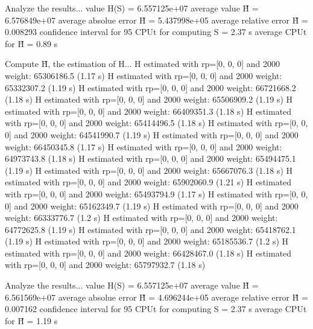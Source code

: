 Analyze the results...
  value H(S)                  = 6.557125e+07 
  average value H̃             = 6.576849e+07 
  average absolue error H̃     = 5.437998e+05 
  average relative error H̃    = 0.008293 
  confidence interval for 95%
  CPUt for computing S         = 2.37 s
  average CPUt for H̃           = 0.89 s

Compute H̃, the estimation of H...
  H estimated with rp=[0, 0, 0] and 2000 weight:  65306186.5  (1.17 s)
  H estimated with rp=[0, 0, 0] and 2000 weight:  65332307.2  (1.19 s)
  H estimated with rp=[0, 0, 0] and 2000 weight:  66721668.2  (1.18 s)
  H estimated with rp=[0, 0, 0] and 2000 weight:  65506909.2  (1.19 s)
  H estimated with rp=[0, 0, 0] and 2000 weight:  66409351.3  (1.18 s)
  H estimated with rp=[0, 0, 0] and 2000 weight:  65414496.5  (1.18 s)
  H estimated with rp=[0, 0, 0] and 2000 weight:  64541990.7  (1.19 s)
  H estimated with rp=[0, 0, 0] and 2000 weight:  66450345.8  (1.17 s)
  H estimated with rp=[0, 0, 0] and 2000 weight:  64973743.8  (1.18 s)
  H estimated with rp=[0, 0, 0] and 2000 weight:  65494475.1  (1.19 s)
  H estimated with rp=[0, 0, 0] and 2000 weight:  65667076.3  (1.18 s)
  H estimated with rp=[0, 0, 0] and 2000 weight:  65902060.9  (1.21 s)
  H estimated with rp=[0, 0, 0] and 2000 weight:  65493794.9  (1.17 s)
  H estimated with rp=[0, 0, 0] and 2000 weight:  65162349.7  (1.19 s)
  H estimated with rp=[0, 0, 0] and 2000 weight:  66333776.7  (1.2 s)
  H estimated with rp=[0, 0, 0] and 2000 weight:  64772625.8  (1.19 s)
  H estimated with rp=[0, 0, 0] and 2000 weight:  65418762.1  (1.19 s)
  H estimated with rp=[0, 0, 0] and 2000 weight:  65185536.7  (1.2 s)
  H estimated with rp=[0, 0, 0] and 2000 weight:  66428467.0  (1.18 s)
  H estimated with rp=[0, 0, 0] and 2000 weight:  65797932.7  (1.18 s)

Analyze the results...
  value H(S)                  = 6.557125e+07 
  average value H̃             = 6.561569e+07 
  average absolue error H̃     = 4.696244e+05 
  average relative error H̃    = 0.007162 
  confidence interval for 95%
  CPUt for computing S         = 2.37 s
  average CPUt for H̃           = 1.19 s

